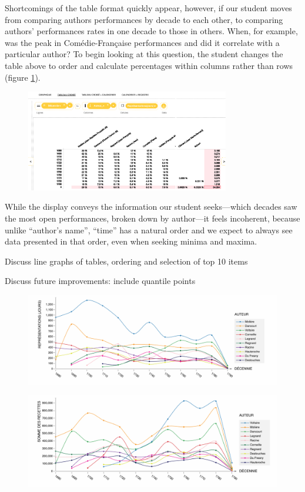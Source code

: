 \documentclass[	DIV=calc,%
							paper=a4,%
							fontsize=11pt,%
							twocolumn]{scrartcl}	 					%
\begin{document}
Shortcomings of the table format quickly appear, however, if our student moves from comparing authors performances by decade to each other, to comparing authors’ performances rates in one decade to those in others.  When, for example, was the peak in Comédie-Française performances and did it correlate with a particular author?  To begin looking at this question, the student changes the table above to order and calculate percentages within columns rather than rows (figure \ref{fig:percents-incoherent}).

\begin{figure}
  \centering
	\includegraphics[width=3.5in]{steps/percents-incoherent.png}
	\caption{}
	\label{fig:percents-incoherent}
\end{figure}

While the display conveys the information our student seeks—which decades saw the most open performances, broken down by author—it feels incoherent, because unlike ``author’s name'', ``time'' has a natural order and we expect to always see data presented in that order, even when seeking minima and maxima.

Discuss line graphs of tables, ordering and selection of top 10 items

Discuss future improvements:  include quantile points

\begin{figure}
  \centering
	\includegraphics[width=7in]{steps/top-author-performances.png}
	\caption{}
	\label{fig:top-author-performances}
\end{figure}

\begin{figure}
  \centering
	\includegraphics[width=7in]{steps/top-author-receipts.png}
	\caption{}
	\label{fig:top-author-receipts}
\end{figure}
\end{document}
